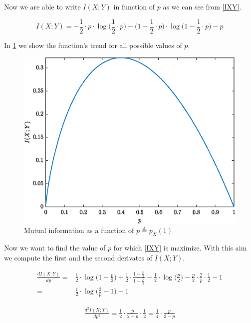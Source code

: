 Now we are able to write $I(X;Y)$ in function of $p$ as we can see from \eqref{IXY}.

\begin{equation}
	I(X;Y) = -\frac{1}{2}\cdot p \cdot \log\Big(\frac{1}{2}\cdot p\Big)-\Big(1-\frac{1}{2}\cdot p\Big)\cdot \log \Big(1-\frac{1}{2}\cdot p\Big)-p
	\label{IXY}
\end{equation}

\pagebreak

In \ref{fig:funcinfoex1} we show the function's trend for all possible values of $p$.

\begin{figure}[h!]
	\centering
	\includegraphics[width=0.7\linewidth]{img/func_info_ex1}
	\caption{Mutual information as a function of $p \triangleq p_X(1)$}
	\label{fig:funcinfoex1}
\end{figure}

Now we want to find the value of $p$ for which \eqref{IXY} is maximize. With this aim we compute the first and the second derivates of $I(X;Y)$.

\begin{equation}
\begin{aligned}
	\frac{dI(X;Y)}{dp}= &\frac{1}{2} \cdot \log \Big( 1 - \frac{p}{2}\Big)+ \frac{1}{2} \cdot \frac{1- \frac{p}{2}}{1-\frac{p}{2}} - \frac{1}{2} \cdot \log\Big ( \frac{p}{2}\Big)-\frac{p}{2} \cdot \frac{2}{p} \cdot \frac{1}{2} - 1 \\
	= & \frac{1}{2} \cdot \log \Big ( \frac{2}{p} - 1\Big)-1
	\end{aligned}
	\end{equation}

\begin{equation}
\begin{aligned}
	\frac{d^2I(X;Y)}{dp^2}= \frac{1}{2}\cdot \frac{p}{2-p} \cdot \frac{1}{2}= \frac{1}{4} \cdot \frac{p}{2-p}
\end{aligned}
\end{equation}

